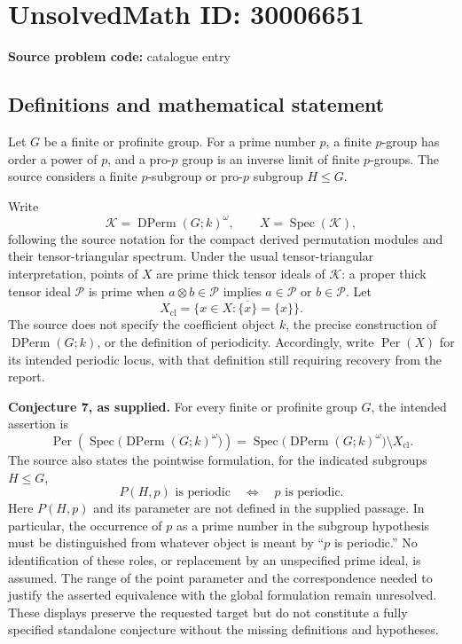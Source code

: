 \documentclass[11pt]{article}
\begin{document}
\section*{UnsolvedMath ID: 30006651}
\textbf{Source problem code:} catalogue entry
\subsection{Definitions and mathematical statement}
Let \(G\) be a finite or profinite group. For a prime number \(p\), a finite \(p\)-group has order a power of \(p\), and a pro-\(p\) group is an inverse limit of finite \(p\)-groups. The source considers a finite \(p\)-subgroup or pro-\(p\) subgroup \(H\leq G\).

Write
\[
\mathcal K=\operatorname{DPerm}(G;k)^\omega,
\qquad
X=\operatorname{Spec}(\mathcal K),
\]
following the source notation for the compact derived permutation modules and their tensor-triangular spectrum. Under the usual tensor-triangular interpretation, points of \(X\) are prime thick tensor ideals of \(\mathcal K\): a proper thick tensor ideal \(\mathcal P\) is prime when \(a\otimes b\in\mathcal P\) implies \(a\in\mathcal P\) or \(b\in\mathcal P\). Let
\[
X_{\mathrm{cl}}=\{x\in X:\overline{\{x\}}=\{x\}\}.
\]
The source does not specify the coefficient object \(k\), the precise construction of \(\operatorname{DPerm}(G;k)\), or the definition of periodicity. Accordingly, write \(\operatorname{Per}(X)\) for its intended periodic locus, with that definition still requiring recovery from the report.

\textbf{Conjecture 7, as supplied.} For every finite or profinite group \(G\), the intended assertion is
\[
\operatorname{Per}\!\left(\operatorname{Spec}\bigl(\operatorname{DPerm}(G;k)^\omega\bigr)\right)
=
\operatorname{Spec}\bigl(\operatorname{DPerm}(G;k)^\omega\bigr)\setminus X_{\mathrm{cl}}.
\]
The source also states the pointwise formulation, for the indicated subgroups \(H\leq G\),
\[
P(H,p)\text{ is periodic}\quad\Longleftrightarrow\quad p\text{ is periodic}.
\]
Here \(P(H,p)\) and its parameter are not defined in the supplied passage. In particular, the occurrence of \(p\) as a prime number in the subgroup hypothesis must be distinguished from whatever object is meant by ``\(p\) is periodic.'' No identification of these roles, or replacement by an unspecified prime ideal, is assumed. The range of the point parameter and the correspondence needed to justify the asserted equivalence with the global formulation remain unresolved. These displays preserve the requested target but do not constitute a fully specified standalone conjecture without the missing definitions and hypotheses.
\end{document}

